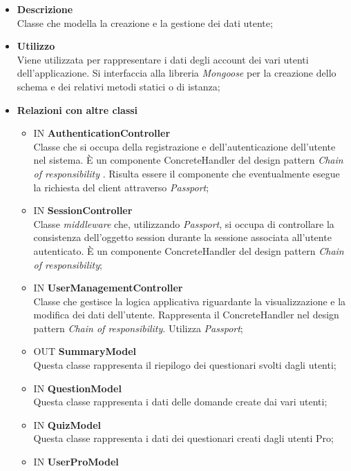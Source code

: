 \begin{itemize}
	\item \textbf{Descrizione} \\
	Classe che modella la creazione e la gestione dei dati utente;
	\item \textbf{Utilizzo} \\
	Viene utilizzata per rappresentare i dati degli account dei vari utenti dell'applicazione. Si interfaccia alla libreria \textit{Mongoose} per la creazione dello schema e dei relativi metodi statici o di istanza;
	\item \textbf{Relazioni con altre classi} 
		\begin{itemize}
			\item IN \textbf {AuthenticationController} \\
			Classe che si occupa della registrazione e dell'autenticazione dell'utente nel sistema. È un componente ConcreteHandler del design pattern \textit{Chain of responsibility} . Risulta essere il componente che eventualmente esegue la richiesta del client attraverso \textit{Passport};
			\item IN \textbf {SessionController} \\
			Classe \textit{middleware} che, utilizzando \textit{Passport}, si occupa di controllare la consistenza dell'oggetto session durante la sessione associata all’utente autenticato. È un componente ConcreteHandler del design pattern \textit{Chain of responsibility};
			\item IN \textbf {UserManagementController} \\
			Classe che gestisce la logica applicativa riguardante la visualizzazione e la modifica dei dati dell'utente.
Rappresenta il ConcreteHandler nel design pattern \textit{Chain of responsibility}. Utilizza \textit{Passport};
			\item OUT \textbf{SummaryModel} \\
			Questa classe rappresenta il riepilogo dei questionari svolti dagli utenti;
			\item IN \textbf{QuestionModel} \\
			Questa classe rappresenta i dati delle domande create dai vari utenti;
			\item IN \textbf{QuizModel} \\
			Questa classe rappresenta i dati dei questionari creati dagli utenti Pro;
			\item IN \textbf{UserProModel} \\

\end{itemize}
\end{itemize}
